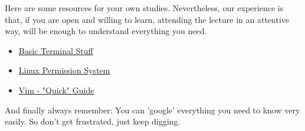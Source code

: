 Here are some resources for your own studies. Nevertheless, our experience is that, if you are open and willing to learn, attending the lecture in an attentive way, will be enough to understand everything you need.
\begin{itemize}
\item \href{https://www.digitalocean.com/community/tutorials/an-introduction-to-linux-basics}{Basic Terminal Stuff}
\item \href{https://www.digitalocean.com/community/tutorials/linux-permissions-basics-and-how-to-use-umask-on-a-vps}{Linux Permission System}
\item \href{https://www.tutorialspoint.com/vim/vim_quick_guide.htm}{Vim - "Quick" Guide}
\end{itemize}

And finally always remember: You can 'google' everything you need to know very easily. So don't get frustrated, just keep digging.

